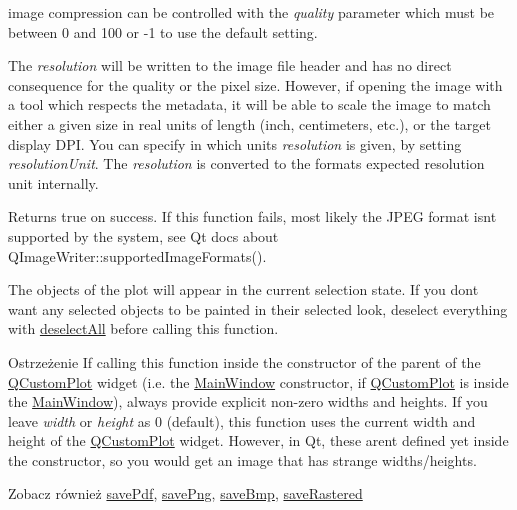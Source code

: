 image compression can be controlled with the {\itshape quality} parameter which must be between 0 and 100 or -\/1 to use the default setting.

The {\itshape resolution} will be written to the image file header and has no direct consequence for the quality or the pixel size. However, if opening the image with a tool which respects the metadata, it will be able to scale the image to match either a given size in real units of length (inch, centimeters, etc.), or the target display D\+PI. You can specify in which units {\itshape resolution} is given, by setting {\itshape resolution\+Unit}. The {\itshape resolution} is converted to the format\textquotesingle{}s expected resolution unit internally.

Returns true on success. If this function fails, most likely the J\+P\+EG format isn\textquotesingle{}t supported by the system, see Qt docs about Q\+Image\+Writer\+::supported\+Image\+Formats().

The objects of the plot will appear in the current selection state. If you don\textquotesingle{}t want any selected objects to be painted in their selected look, deselect everything with \hyperlink{class_q_custom_plot_a9d4808ab925b003054085246c92a257c}{deselect\+All} before calling this function.

\begin{DoxyWarning}{Ostrzeżenie}
If calling this function inside the constructor of the parent of the \hyperlink{class_q_custom_plot}{Q\+Custom\+Plot} widget (i.\+e. the \hyperlink{class_main_window}{Main\+Window} constructor, if \hyperlink{class_q_custom_plot}{Q\+Custom\+Plot} is inside the \hyperlink{class_main_window}{Main\+Window}), always provide explicit non-\/zero widths and heights. If you leave {\itshape width} or {\itshape height} as 0 (default), this function uses the current width and height of the \hyperlink{class_q_custom_plot}{Q\+Custom\+Plot} widget. However, in Qt, these aren\textquotesingle{}t defined yet inside the constructor, so you would get an image that has strange widths/heights.
\end{DoxyWarning}
\begin{DoxySeeAlso}{Zobacz również}
\hyperlink{class_q_custom_plot_ad5acd34f6b39c3516887d7e54fec2412}{save\+Pdf}, \hyperlink{class_q_custom_plot_ac92cc9256d12f354b40a4be4600b5fb9}{save\+Png}, \hyperlink{class_q_custom_plot_ae3a86ed0795670e50afa21759d4fa13d}{save\+Bmp}, \hyperlink{class_q_custom_plot_ad7723ce2edfa270632ef42b03a444352}{save\+Rastered} 
\end{DoxySeeAlso}
